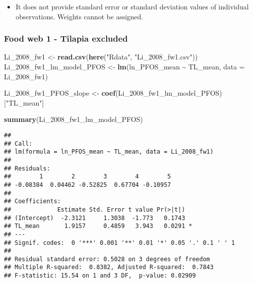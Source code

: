 \documentclass[
]{article}
\newenvironment{Shaded}{\begin{snugshade}}{\end{snugshade}}
\newcommand{\AttributeTok}[1]{\textcolor[rgb]{0.13,0.29,0.53}{#1}}
\newcommand{\FunctionTok}[1]{\textcolor[rgb]{0.13,0.29,0.53}{\textbf{#1}}}
\newcommand{\NormalTok}[1]{#1}
\newcommand{\OtherTok}[1]{\textcolor[rgb]{0.56,0.35,0.01}{#1}}
\newcommand{\SpecialCharTok}[1]{\textcolor[rgb]{0.81,0.36,0.00}{\textbf{#1}}}
\newcommand{\StringTok}[1]{\textcolor[rgb]{0.31,0.60,0.02}{#1}}
\providecommand{\tightlist}{%
  \setlength{\itemsep}{0pt}\setlength{\parskip}{0pt}}
\begin{document}
\begin{itemize}
\tightlist
\item
  It does not provide standard error or standard deviation values of
  individual observations. Weights cannot be assigned.
\end{itemize}

\subsubsection{Food web 1 - Tilapia
excluded}\label{food-web-1---tilapia-excluded}

\begin{Shaded}
\begin{Highlighting}[]
\NormalTok{Li\_2008\_fw1 }\OtherTok{\textless{}{-}} \FunctionTok{read.csv}\NormalTok{(}\FunctionTok{here}\NormalTok{(}\StringTok{"Rdata"}\NormalTok{, }\StringTok{"Li\_2008\_fw1.csv"}\NormalTok{))}
\NormalTok{Li\_2008\_fw1\_lm\_model\_PFOS }\OtherTok{\textless{}{-}} \FunctionTok{lm}\NormalTok{(ln\_PFOS\_mean }\SpecialCharTok{\textasciitilde{}}\NormalTok{ TL\_mean,}
                                \AttributeTok{data =}\NormalTok{ Li\_2008\_fw1)}

\NormalTok{Li\_2008\_fw1\_PFOS\_slope }\OtherTok{\textless{}{-}} \FunctionTok{coef}\NormalTok{(Li\_2008\_fw1\_lm\_model\_PFOS)[}\StringTok{"TL\_mean"}\NormalTok{]}

\FunctionTok{summary}\NormalTok{(Li\_2008\_fw1\_lm\_model\_PFOS)}
\end{Highlighting}
\end{Shaded}

\begin{verbatim}
## 
## Call:
## lm(formula = ln_PFOS_mean ~ TL_mean, data = Li_2008_fw1)
## 
## Residuals:
##        1        2        3        4        5 
## -0.08384  0.04462 -0.52825  0.67704 -0.10957 
## 
## Coefficients:
##             Estimate Std. Error t value Pr(>|t|)  
## (Intercept)  -2.3121     1.3038  -1.773   0.1743  
## TL_mean       1.9157     0.4859   3.943   0.0291 *
## ---
## Signif. codes:  0 '***' 0.001 '**' 0.01 '*' 0.05 '.' 0.1 ' ' 1
## 
## Residual standard error: 0.5028 on 3 degrees of freedom
## Multiple R-squared:  0.8382, Adjusted R-squared:  0.7843 
## F-statistic: 15.54 on 1 and 3 DF,  p-value: 0.02909
\end{verbatim}
\end{document}
